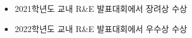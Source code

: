 \begin{research}
	\begin{itemize}
		\item 2021학년도 교내 R\&E 발표대회에서 장려상 수상
		\item 2022학년도 교내 R\&E 발표대회에서 우수상 수상
	\end{itemize}
\end{research}